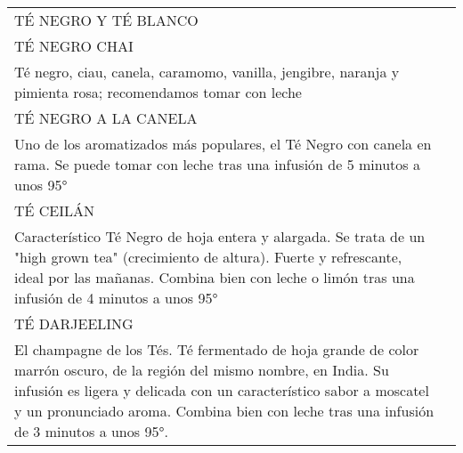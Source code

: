 \documentclass[12pt a5paper]{article}
\makeatletter
\newcommand*\ColText[1]{\textcolor{Goldenrod3}{#1}}
\newenvironment{Group}[1]
{\noindent\begin{tabular*}{\textwidth}{@{}p{1\linewidth}@{\extracolsep{\fill}}r@{}}
{\fontsize{24}{29}\selectfont\ColText{#1}}
              \\[0.8em]}
              {
\end{tabular*}}
\newcommand*\Entry[1]{%
    \sffamily#1}
\newcommand*\Expl[1]{%
    \hspace*{1em}\footnotesize #1}
\makeatother
\begin{document}
    \vfill
    \begin{Group}{TÉ NEGRO Y TÉ BLANCO}
        \Entry{TÉ NEGRO CHAI} \\
        \Expl{Té negro, ciau, canela, caramomo, vanilla, jengibre, naranja y pimienta rosa; recomendamos tomar con leche} \\
        \Entry{TÉ NEGRO A LA CANELA} \\
        \Expl{Uno de los aromatizados más populares, el Té Negro con canela en rama. Se puede tomar con leche tras una infusión de 5 minutos a unos 95°} \\
        \Entry{TÉ CEILÁN} \\
        \Expl{Característico Té Negro de hoja entera y alargada. Se trata de un "high grown tea" (crecimiento de altura). Fuerte y refrescante, ideal por las mañanas. Combina bien con leche o limón tras una infusión de 4 minutos a unos 95°} \\
        \Entry{TÉ DARJEELING} \\
        \Expl{El champagne de los Tés. Té fermentado de hoja grande de color marrón oscuro, de la región del mismo nombre, en India. Su infusión es ligera y delicada con un característico sabor a moscatel y un pronunciado aroma. Combina bien con leche tras una infusión de 3 minutos a unos 95°. } \\
    \end{Group}
\end{document}

